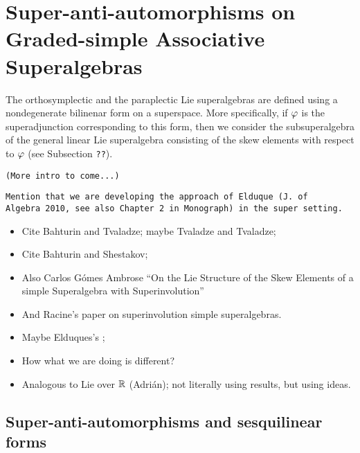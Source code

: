 % 


\chapter{Super-anti-automorphisms on Graded-simple Associative Superalgebras}\label{chap:super-inv}

The orthosymplectic and the paraplectic Lie superalgebras are defined using a nondegenerate bilinenar form on a superspace. 
More specifically, if $\varphi$ is the superadjunction corresponding to this form, then we consider the subsuperalgebra of the general linear Lie superalgebra consisting of the skew elements with respect to $\varphi$ (see Subsection {\tt ??}). 

\vspace{5mm}
{\tt (More intro to come...)}


{\tt Mention that we are developing the approach of Elduque (J. of \\Al\-ge\-bra 2010, see also Chapter 2 in Monograph) in the super setting.}

\begin{itemize}
    \item Cite Bahturin and Tvaladze; maybe Tvaladze and Tvaladze;
    \item Cite Bahturin and Shestakov;
    \item Also Carlos G\'omes Ambrose ``On the Lie Structure of the Skew Elements of a simple Superalgebra with Superinvolution''
    \item And Racine's paper on superinvolution simple superalgebras.
    \item Maybe Elduques's \cite{elduqueSuperinv};
    \item How what we are doing is different?
    \item Analogous to Lie over $\mathbb{R}$ (Adri\'an); not literally using results, but using ideas.
\end{itemize}


\section{Super-anti-automorphisms and ses\-qui\-li\-near\\ forms}\label{sec:super-anti-auto-and-sesquilinear}

